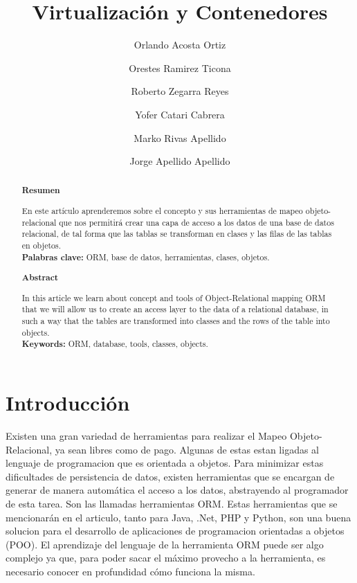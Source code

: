 \documentclass[%
 reprint,
 amsmath,amssymb,
 aps,
]{revtex4-1}
\begin{document}
\title{Virtualización y Contenedores}
\author{Orlando Acosta Ortiz}
\author{Orestes Ramirez Ticona}
\author{Roberto Zegarra Reyes}
\author{Yofer Catari Cabrera}
\author{Marko Rivas Apellido}
\author{Jorge Apellido Apellido}
%

\begin{abstract}
\begin{center}
\textbf{Resumen}
\end{center}
En este artículo aprenderemos sobre el concepto y sus herramientas de mapeo objeto-relacional que nos permitirá crear una capa de acceso a los datos de una base de datos relacional, de tal forma que las tablas se transforman en clases y las filas de las tablas en objetos.\\
\textbf{Palabras clave:}   ORM, base de datos, herramientas, clases, objetos.\\

\begin{center}
\textbf{Abstract}
\end{center}
In this article we learn about concept and tools of Object-Relational mapping ORM that we will allow us to create an access layer to the data of a relational database, in such a way that the tables are transformed into classes and the rows of the table into objects.\\
\textbf{Keywords:}   ORM, database, tools, classes, objects.

\end{abstract}



\maketitle


\section {Introducción}\label{sec:1}
Existen una gran variedad de herramientas para realizar el Mapeo Objeto-Relacional, ya sean libres como de pago. Algunas de estas estan ligadas al lenguaje de programacion que es orientada a objetos. Para minimizar estas dificultades de persistencia de datos, existen herramientas que se encargan de generar de manera automática el acceso a los datos, abstrayendo al programador de esta tarea. Son las llamadas herramientas ORM.
Estas herramientas que se mencionarán en el articulo, tanto para Java, .Net, PHP y Python, son una buena solucion para el desarrollo de aplicaciones de programacion orientadas a objetos (POO). 
El aprendizaje del lenguaje de la herramienta ORM puede ser algo complejo ya que, para poder sacar el máximo provecho a la herramienta, es necesario conocer en profundidad cómo funciona la misma.
\end{document}
